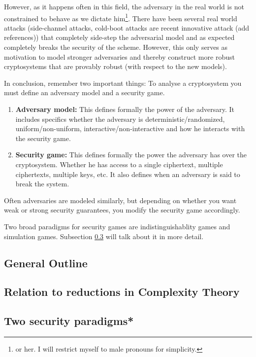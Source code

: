 \documentclass[A4, 11pt]{article}
\begin{document}
However, as it happens often in this field, the adversary in the real world
is not constrained to behave as we dictate him\footnote{or her. I will
restrict myself to male pronouns for simplicity.}. There have been several
real world attacks (side-channel attacks, cold-boot attacks are recent
innovative attack (add references)) that completely side-step the
adversarial model and as expected completely breaks the security of the
scheme. However, this only serves as motivation to model stronger
adversaries and thereby construct more robust cryptosystems that are
provably robust (with respect to the new models).

\par
In conclusion, remember two important things: To analyse a cryptosystem you
must define an adversary model and a security game. 

\begin{enumerate}
\item {\bf Adversary model:} This defines formally the power of the
adversary. It includes specifics whether the adversary is
deterministic/randomized, uniform/non-uniform, interactive/non-interactive
and how he interacts with the security game. 

\item {\bf Security game:} This defines formally the power the adversary
has over the cryptosystem. Whether he has access to a single ciphertext,
multiple ciphertexts, multiple keys, etc. It also defines when an adversary
is said to break the system. 
\end{enumerate}
Often adversaries are modeled similarly, but depending on whether you want
weak or strong security guarantees, you modify the security game
accordingly.

Two broad paradigms for security games are indistinguishablity games and
simulation games. Subsection \ref{subsec:indsim} will talk about it in more
detail. 

\subsection{General Outline}
\subsection{Relation to reductions in Complexity Theory}

\subsection{Two security paradigms*} \label{subsec:indsim}
\end{document}

